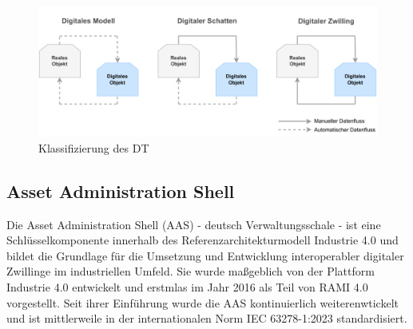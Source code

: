 
\begin{figure}[htbp]
    \centering
    \includegraphics[width=1\textwidth]{Bilder/klassifizierung_DT.pdf}
    \caption{Klassifizierung des DT}
    \label{fig:klassifizierungDT}
\end{figure}






\newpage
\subsection{Asset Administration Shell}
Die Asset Administration Shell (AAS) - deutsch Verwaltungsschale - ist eine Schlüsselkomponente innerhalb des Referenzarchitekturmodell Industrie 4.0 \cite{RAMI4.0} und bildet die Grundlage für die Umsetzung und Entwicklung interoperabler digitaler Zwillinge im industriellen Umfeld.
Sie wurde maßgeblich von der Plattform Industrie 4.0 entwickelt und erstmlas im Jahr 2016 als Teil von RAMI 4.0 vorgestellt.
Seit ihrer Einführung wurde die AAS kontinuierlich weiterenwtickelt und ist mittlerweile in der internationalen Norm IEC 63278-1:2023 \cite{AASIEC63278} standardisiert.

